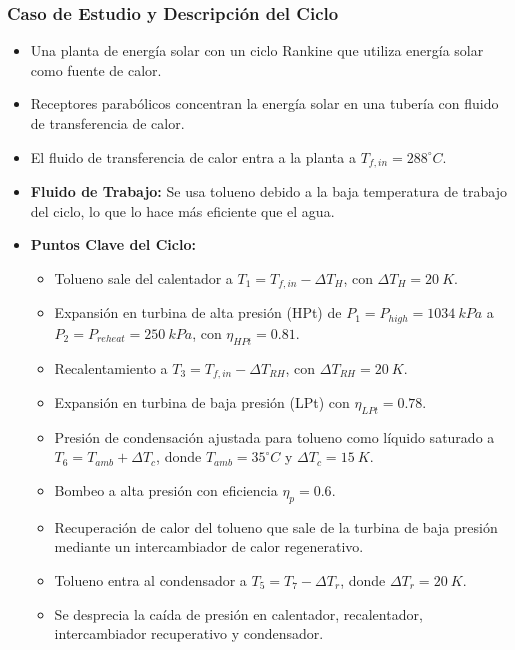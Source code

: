 \documentclass{beamer}
\begin{document}
\begin{frame}
    \frametitle{Caso de Estudio y Descripción del Ciclo}
    \begin{itemize}
        \item Una planta de energía solar con un ciclo Rankine que utiliza energía solar como fuente de calor.
        \item Receptores parabólicos concentran la energía solar en una tubería con fluido de transferencia de calor.
        \item El fluido de transferencia de calor entra a la planta a $T_{f,in} = 288^{\circ}C$.
        \item \textbf{Fluido de Trabajo:} Se usa tolueno debido a la baja temperatura de trabajo del ciclo, lo que lo hace más eficiente que el agua.
        \item \textbf{Puntos Clave del Ciclo:}
        \begin{itemize}
            \item Tolueno sale del calentador a $T_1 = T_{f,in} - \Delta T_H$, con $\Delta T_H = 20~K$.
            \item Expansión en turbina de alta presión (HPt) de $P_1 = P_{high} = 1034~kPa$ a $P_2 = P_{reheat} = 250~kPa$, con $\eta_{HPt} = 0.81$.
            \item Recalentamiento a $T_3 = T_{f,in} - \Delta T_{RH}$, con $\Delta T_{RH} = 20~K$.
            \item Expansión en turbina de baja presión (LPt) con $\eta_{LPt} = 0.78$.
            \item Presión de condensación ajustada para tolueno como líquido saturado a $T_6 = T_{amb} + \Delta T_c$, donde $T_{amb} = 35^{\circ}C$ y $\Delta T_c = 15~K$.
            \item Bombeo a alta presión con eficiencia $\eta_p = 0.6$.
            \item Recuperación de calor del tolueno que sale de la turbina de baja presión mediante un intercambiador de calor regenerativo.
            \item Tolueno entra al condensador a $T_5 = T_7 - \Delta T_r$, donde $\Delta T_r = 20~K$.
            \item Se desprecia la caída de presión en calentador, recalentador, intercambiador recuperativo y condensador.
        \end{itemize}
    \end{itemize}
\end{frame}
\end{document}
